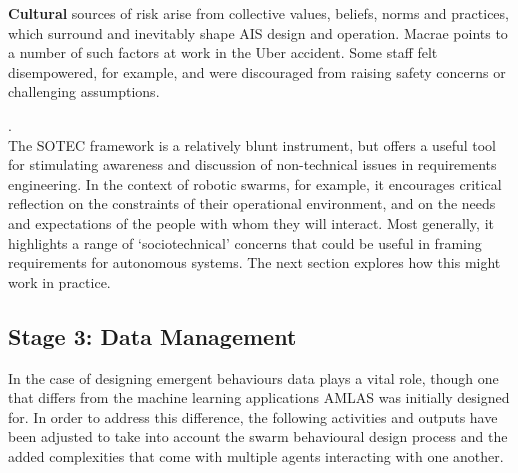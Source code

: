 \documentclass[lettersize,journal]{IEEEtran}
\begin{document}
\textbf{Cultural} sources of risk arise from collective values, beliefs, norms and practices, which surround and inevitably shape AIS design and operation. Macrae points to a number of such factors at work in the Uber accident. Some staff felt disempowered, for example, and were discouraged from raising safety concerns or challenging assumptions.

.\\The SOTEC framework is a relatively blunt instrument, but offers a useful tool for stimulating awareness and discussion of non-technical issues in requirements engineering. In the context of robotic swarms, for example, it encourages critical reflection on the constraints of their operational environment, and on the needs and expectations of the people with whom they will interact. Most generally, it highlights a range of ‘sociotechnical’ concerns that could be useful in framing requirements for autonomous systems. The next section explores how this might work in practice.


\subsection{Stage 3: Data Management} \label{framework-stage3}

In the case of designing emergent behaviours data plays a vital role, though one that differs from the machine learning applications AMLAS was initially designed for. In order to address this difference, the following activities and outputs have been adjusted to take into account the swarm behavioural design process and the added complexities that come with multiple agents interacting with one another.
\end{document}
